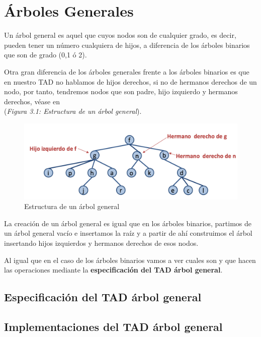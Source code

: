 \chapter{Árboles Generales}
Un árbol general es aquel que cuyos nodos son de cualquier grado, es decir, pueden tener un número cualquiera de hijos, a diferencia de los árboles binarios que son de grado (0,1 ó 2).

Otra gran diferencia de los árboles generales frente a los árboles binarios es que en nuestro TAD no hablamos de hijos derechos, si no de hermanos derechos de un nodo, por tanto, tendremos nodos que son padre, hijo izquierdo y hermanos derechos, véase en\\ (\textit{Figura 3.1: Estructura de un árbol general}).

\begin{figure}[h]
  \begin{center}
    \includegraphics[width=\textwidth]{assets/Agen1.png}
  \end{center}
  \caption[short]{Estructura de un árbol general}
\end{figure}

La creación de un árbol general es igual que en los árboles binarios, partimos de un árbol general vacío e insertamos la raíz y a partir de ahí construimos el árbol insertando hijos izquierdos y hermanos derechos de esos nodos.

Al igual que en el caso de los árboles binarios vamos a ver cuales son y que hacen las operaciones mediante la \textbf{especificación del TAD árbol general}.
\section{Especificación del TAD árbol general}

\section{Implementaciones del TAD árbol general}



